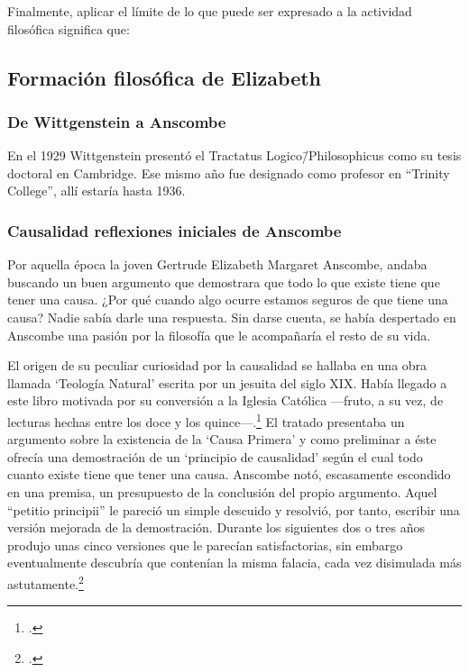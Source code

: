       Finalmente, aplicar el límite de lo que puede ser expresado a la actividad
      filosófica significa que:

      \subsection{Formación filosófica de Elizabeth}
      \subsubsection{De Wittgenstein a Anscombe}
      En el 1929 Wittgenstein presentó el Tractatus Logico\=/Philosophicus como su
      tesis doctoral en Cambridge. Ese mismo año fue designado como profesor en
      ``Trinity College'', allí estaría hasta 1936.

      \subsubsection{Causalidad reflexiones iniciales de Anscombe}
      Por aquella época la joven Gertrude Elizabeth Margaret Anscombe, andaba buscando
      un buen argumento que demostrara que todo lo que existe tiene que tener una
      causa. ¿Por qué cuando algo ocurre estamos seguros de que tiene una causa? Nadie
      sabía darle una respuesta. Sin darse cuenta, se había despertado en Anscombe
      una pasión por la filosofía que le acompañaría el resto de su vida.

      El origen de su peculiar curiosidad por la causalidad se hallaba en una obra
      llamada `Teología Natural' escrita por un jesuita del siglo XIX. Había llegado a
      este libro motivada por su conversión a la Iglesia Católica ---fruto, a su vez,
      de lecturas hechas entre los doce y los quince---.\footcite[cf.~][p.~vii \S1]{M&PotM}
      El tratado presentaba un argumento sobre la existencia de la `Causa Primera' y
      como preliminar a éste ofrecía una demostración de un `principio de causalidad'
      según el cual todo cuanto existe tiene que tener una causa. Anscombe notó,
      escasamente escondido en una premisa, un presupuesto de la conclusión del propio
      argumento. Aquel ``petitio principii'' le pareció un simple descuido y resolvió,
      por tanto, escribir una versión mejorada de la demostración.
      Durante los siguientes dos o tres años produjo unas cinco versiones que le
      parecían satisfactorias, sin embargo eventualmente descubría que contenían la
      misma falacia, cada vez disimulada más astutamente.\footcite[cf.~][p.~vii
      \S2]{M&PotM} 

